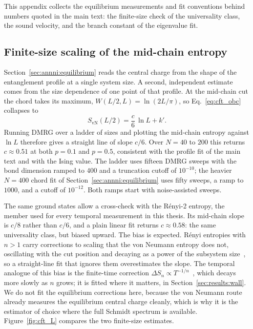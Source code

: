 This appendix collects the equilibrium measurements and fit conventions behind numbers quoted in the main text: the finite-size check of the universality class, the sound velocity, and the branch constant of the eigenvalue fit.

\subsection{Finite-size scaling of the mid-chain entropy}
\label{app:fss}

Section~\ref{sec:annni:equilibrium} reads the central charge from the shape of the entanglement profile at a single system size. A second, independent estimate comes from the size dependence of one point of that profile. At the mid-chain cut the chord takes its maximum, $W(L/2,L)=\ln(2L/\pi)$, so Eq.~\eqref{eq:cft_obc} collapses to
\begin{equation}
    S_{\mathrm{vN}}(L/2) = \frac{c}{6}\,\ln L + k'.
    \tag{G0}
    \label{eq:cft_mid}
\end{equation}
Running DMRG over a ladder of sizes and plotting the mid-chain entropy against $\ln L$ therefore gives a straight line of slope $c/6$. Over $N=40$ to $200$ this returns $c\approx0.51$ at both $p=0.1$ and $p=0.5$, consistent with the profile fit of the main text and with the Ising value. The ladder uses fifteen DMRG sweeps with the bond dimension ramped to $400$ and a truncation cutoff of $10^{-10}$; the heavier $N=400$ chord fit of Section~\ref{sec:annni:equilibrium} uses fifty sweeps, a ramp to $1000$, and a cutoff of $10^{-12}$. Both ramps start with noise-assisted sweeps.

The same ground states allow a cross-check with the R\'enyi-2 entropy, the member used for every temporal measurement in this thesis. Its mid-chain slope is $c/8$ rather than $c/6$, and a plain linear fit returns $c\approx0.58$: the same universality class, but biased upward. The bias is expected. R\'enyi entropies with $n>1$ carry corrections to scaling that the von Neumann entropy does not, oscillating with the cut position and decaying as a power of the subsystem size~\cite{calabrese2010}, so a straight-line fit that ignores them overestimates the slope. The temporal analogue of this bias is the finite-time correction $\Delta S_n \propto T^{-1/n}$~\cite{boucomas2026}, which decays more slowly as $n$ grows; it is fitted where it matters, in Section~\ref{sec:results:wall}. We do not fit the equilibrium corrections here, because the von Neumann route already measures the equilibrium central charge cleanly, which is why it is the estimator of choice where the full Schmidt spectrum is available. Figure~\ref{fig:cft_L} compares the two finite-size estimates.

